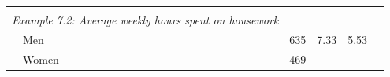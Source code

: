 \documentclass[11pt,a4paper,openany]{book}
\begin{document}
\begin{longtable}[]{@{}lrrrr@{}}
\begin{minipage}[t]{0.06\columnwidth}
\strut
\end{minipage} & \begin{minipage}[t]{0.10\columnwidth}\raggedleft\strut
\strut
\end{minipage} & \begin{minipage}[t]{0.07\columnwidth}\raggedleft\strut
\strut
\end{minipage} & \begin{minipage}[t]{0.08\columnwidth}\raggedleft\strut
\strut
\end{minipage}\tabularnewline
\begin{minipage}[t]{0.55\columnwidth}\raggedright\strut
\emph{Example 7.2: Average weekly hours spent on housework}\strut
\end{minipage} & \begin{minipage}[t]{0.06\columnwidth}\raggedleft\strut
\strut
\end{minipage} & \begin{minipage}[t]{0.10\columnwidth}\raggedleft\strut
\strut
\end{minipage} & \begin{minipage}[t]{0.07\columnwidth}\raggedleft\strut
\strut
\end{minipage} & \begin{minipage}[t]{0.08\columnwidth}\raggedleft\strut
\strut
\end{minipage}\tabularnewline
\begin{minipage}[t]{0.55\columnwidth}\raggedright\strut
~~Men\strut
\end{minipage} & \begin{minipage}[t]{0.06\columnwidth}\raggedleft\strut
635\strut
\end{minipage} & \begin{minipage}[t]{0.10\columnwidth}\raggedleft\strut
7.33\strut
\end{minipage} & \begin{minipage}[t]{0.07\columnwidth}\raggedleft\strut
5.53\strut
\end{minipage} & \begin{minipage}[t]{0.08\columnwidth}\raggedleft\strut
\strut
\end{minipage}\tabularnewline
\begin{minipage}[t]{0.55\columnwidth}\raggedright\strut
~~Women \newline\strut
\end{minipage} & \begin{minipage}[t]{0.06\columnwidth}\raggedleft\strut
469\strut
\end{minipage} & \begin{minipage}[t]{0.10\columnwidth}\raggedleft\strut

\end{minipage}
\end{longtable}
\end{document}

